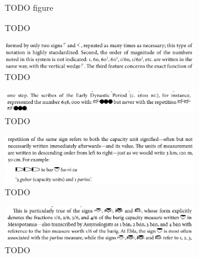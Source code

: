 \documentclass[10pt, a4paper, twoside]{article}
\begin{document}
\begin{figure}
  \begin{center}
  TODO figure
  \caption{TODO \cite[6]{Chambon2003}\label{chambon6}}
  \end{center}
\end{figure}

\begin{figure}
  \begin{center}
  \includegraphics[width=0.75\textwidth]{chambon-58.png}
  \caption{TODO \cite[58]{Chambon2012}\label{chambon58}}
  \end{center}
\end{figure}
\begin{figure}
  \begin{center}
  \includegraphics[width=0.75\textwidth]{chambon-59.png}
  \caption[TODO]{TODO \cite[59]{Chambon2012}\label{chambon59}\footnotemark}
  \end{center}
\end{figure}
\begin{figure}
  \begin{center}
  \includegraphics[width=0.75\textwidth]{chambon-61.png}
  \caption{TODO \cite[61]{Chambon2012}\label{chambon61}}
  \end{center}
\end{figure}
\begin{figure}
  \begin{center}
  \includegraphics[width=0.75\textwidth]{chambon-63.png}
  \caption{TODO \cite[64]{Chambon2012}\label{chambon64}}
  \end{center}
\end{figure}
\end{document}
